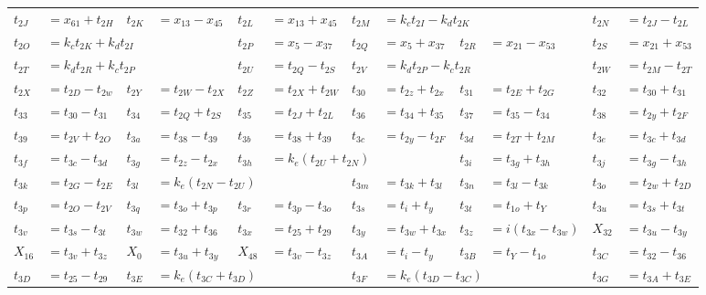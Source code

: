\begin{tabular}{|p{4.3pt}l|p{4.3pt}l|p{4.3pt}l|p{4.3pt}l|p{4.3pt}l|p{4.3pt}l|}
$t_{2J} $ &$= x_{61} + t_{2H}$ & $t_{2K} $ &$= x_{13} - x_{45}$ & $t_{2L} $ &$= x_{13} + x_{45}$ & $t_{2M} $ &\multicolumn{3}{l|}{$= k_ct_{2I} - k_dt_{2K}$} & $t_{2N} $ &$= t_{2J} - t_{2L}$\\ 
$t_{2O} $ &\multicolumn{3}{l|}{$= k_ct_{2K} + k_dt_{2I}$} & $t_{2P} $ &$= x_5 - x_{37}$ & $t_{2Q} $ &$= x_5 + x_{37}$ & $t_{2R} $ &$= x_{21} - x_{53}$ & $t_{2S} $ &$= x_{21} + x_{53}$\\ 
$t_{2T} $ &\multicolumn{3}{l|}{$= k_dt_{2R} + k_ct_{2P}$} & $t_{2U} $ &$= t_{2Q} - t_{2S}$ & $t_{2V} $ &\multicolumn{3}{l|}{$= k_dt_{2P} - k_ct_{2R}$} & $t_{2W} $ &$= t_{2M} - t_{2T}$\\ 
$t_{2X} $ &$= t_{2D} - t_{2w}$ & $t_{2Y} $ &$= t_{2W} - t_{2X}$ & $t_{2Z} $ &$= t_{2X} + t_{2W}$ & $t_{30} $ &$= t_{2z} + t_{2x}$ & $t_{31} $ &$= t_{2E} + t_{2G}$ & $t_{32} $ &$= t_{30} + t_{31}$\\ 
$t_{33} $ &$= t_{30} - t_{31}$ & $t_{34} $ &$= t_{2Q} + t_{2S}$ & $t_{35} $ &$= t_{2J} + t_{2L}$ & $t_{36} $ &$= t_{34} + t_{35}$ & $t_{37} $ &$= t_{35} - t_{34}$ & $t_{38} $ &$= t_{2y} + t_{2F}$\\ 
$t_{39} $ &$= t_{2V} + t_{2O}$ & $t_{3a} $ &$= t_{38} - t_{39}$ & $t_{3b} $ &$= t_{38} + t_{39}$ & $t_{3c} $ &$= t_{2y} - t_{2F}$ & $t_{3d} $ &$= t_{2T} + t_{2M}$ & $t_{3e} $ &$= t_{3c} + t_{3d}$\\ 
$t_{3f} $ &$= t_{3c} - t_{3d}$ & $t_{3g} $ &$= t_{2z} - t_{2x}$ & $t_{3h} $ &\multicolumn{3}{l|}{$= k_e(t_{2U} + t_{2N})$} & $t_{3i} $ &$= t_{3g} + t_{3h}$ & $t_{3j} $ &$= t_{3g} - t_{3h}$\\ 
$t_{3k} $ &$= t_{2G} - t_{2E}$ & $t_{3l} $ &\multicolumn{3}{l|}{$= k_e(t_{2N} - t_{2U})$} & $t_{3m} $ &$= t_{3k} + t_{3l}$ & $t_{3n} $ &$= t_{3l} - t_{3k}$ & $t_{3o} $ &$= t_{2w} + t_{2D}$\\ 
$t_{3p} $ &$= t_{2O} - t_{2V}$ & $t_{3q} $ &$= t_{3o} + t_{3p}$ & $t_{3r} $ &$= t_{3p} - t_{3o}$ & $t_{3s} $ &$= t_i + t_y$ & $t_{3t} $ &$= t_{1o} + t_Y$ & $t_{3u} $ &$= t_{3s} + t_{3t}$\\ 
$t_{3v} $ &$= t_{3s} - t_{3t}$ & $t_{3w} $ &$= t_{32} + t_{36}$ & $t_{3x} $ &$= t_{25} + t_{29}$ & $t_{3y} $ &$= t_{3w} + t_{3x}$ & $t_{3z} $ &$= i(t_{3x} - t_{3w})$ & $X_{32} $ &$= t_{3u} - t_{3y}$\\ 
$X_{16} $ &$= t_{3v} + t_{3z}$ & $X_0 $ &$= t_{3u} + t_{3y}$ & $X_{48} $ &$= t_{3v} - t_{3z}$ & $t_{3A} $ &$= t_i - t_y$ & $t_{3B} $ &$= t_Y - t_{1o}$ & $t_{3C} $ &$= t_{32} - t_{36}$\\ 
$t_{3D} $ &$= t_{25} - t_{29}$ & $t_{3E} $ &\multicolumn{3}{l|}{$= k_e(t_{3C} + t_{3D})$} & $t_{3F} $ &\multicolumn{3}{l|}{$= k_e(t_{3D} - t_{3C})$} & $t_{3G} $ &$= t_{3A} + t_{3E}$\\ 

\end{tabular}
